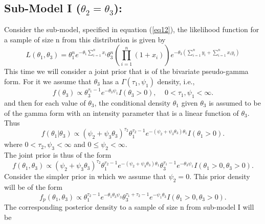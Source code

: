 \documentclass[12pt]{article}    %
\numberwithin{equation}{section}
\begin{document}
\subsection{Sub-Model I ($\theta_2=\theta_3$):}
Consider the sub-model, specified in equation (\ref{eq12}), the likelihood function for a sample of size n from this distribution is given by
\begin{equation}\label{eq24}
L(\theta_1, \theta_3) = \theta_1^n e^{-\theta_1\sum^n_{i=1}x_i}\theta_3^n(\prod^n_{i=1}(1+x_i)) e^{-\theta_3(\sum^n_{i=1}y_i+\sum^n_{i=1}x_iy_i)}
\end{equation}
This time we will consider a joint prior that is of the bivariate pseudo-gamma form. For it we assume that $\theta_3$ has a $\Gamma(\tau_1, \psi_1)$ density, i.e.,
\begin{equation*}
f(\theta_3) \propto \theta_3^{\tau_1-1}e^{-\theta_3\psi_1}I(\theta_3>0), ~~~~~ 0<\tau_1, \psi_1<\infty.
\end{equation*}
and then for each value of $\theta_3$, the conditional density $\theta_1$ given $\theta_3$ is assumed to be of the gamma form with an intensity parameter that is a linear function of $\theta_3$. Thus
\begin{equation*}
f(\theta_1|\theta_3) \propto (\psi_2+\psi_3\theta_3)^{\tau_2}\theta_1^{\tau_2-1}e^{-(\psi_2+\psi_3\theta_3)\theta_1}I(\theta_1>0).
\end{equation*}
where $0<\tau_2, \psi_3 <\infty$ and $0 \leq \psi_2 < \infty$.\\
The joint prior is thus of the form
\begin{equation}\label{eq25}
f(\theta_1,\theta_3) \propto (\psi_2+\psi_3\theta_3)^{\tau_2}\theta_1^{\tau_2-1}e^{-(\psi_2+\psi_3\theta_3)\theta_1}\theta_3^{\tau_1-1}e^{-\theta_3\psi_1}I(\theta_1>0,\theta_3>0).
\end{equation}
Consider the simpler prior in which we assume that $\psi_2=0$. This prior density will be of the form
\begin{equation}\label{eq26}
f_p(\theta_1, \theta_3) \propto \theta_1^{\tau_2-1}e^{-\theta_1\theta_3\psi_3}\theta_3^{\tau_1+\tau_2-1}e^{-\psi_1\theta_3}I(\theta_1>0, \theta_3>0).
\end{equation}
The corresponding posterior density to a sample of size n from sub-model I will be 
\end{document}
